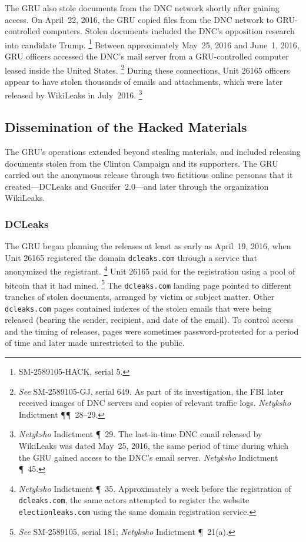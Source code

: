 The GRU also stole documents from the DNC network shortly after gaining access.
On April~22, 2016, the GRU copied files from the DNC network to GRU-controlled computers.
Stolen documents included the DNC's opposition research into candidate Trump.%
\footnote{ SM-2589105-HACK, serial 5.
}
Between approximately May~25, 2016 and June~1, 2016, GRU officers accessed the DNC's mail server from a  GRU-controlled computer leased inside the United States.%
\footnote{
\textit{See} SM-2589105-GJ, serial 649. As part of its investigation, the FBI later received images of DNC servers and copies of relevant traffic logs.
\textit{Netyksho} Indictment \P\P~28--29.}
During these connections, Unit 26165 officers appear to have stolen thousands of emails and attachments, which were later released by WikiLeaks in July~2016.%
\footnote{\textit{Netyksho} Indictment \P~29.
The last-in-time DNC email released by WikiLeaks was dated May~25, 2016, the same period of time during which the GRU gained access to the DNC's email server.
\textit{Netyksho} Indictment \P~45.}

\subsection{Dissemination of the Hacked Materials}

The GRU's operations extended beyond stealing materials, and included releasing documents stolen from the Clinton Campaign and its supporters.
The GRU carried out the anonymous release through two fictitious online personas that it created---DCLeaks and Guccifer~2.0---and later through the organization WikiLeaks.

\subsubsection{DCLeaks}

The GRU began planning the releases at least as early as April~19, 2016, when Unit 26165 registered the domain \verb+dcleaks.com+ through a service that anonymized the registrant.%
\footnote{\textit{Netyksho} Indictment \P~35.
Approximately a week before the registration of \verb+dcleaks.com+, the same actors attempted to register the website \verb+electionleaks.com+ using the same domain registration service.
}
Unit 26165 paid for the registration using a pool of bitcoin that it had mined.%
\footnote{\textit{See} SM-2589105, serial 181;
\textit{Netyksho} Indictment \P~21(a).}
The \verb+dcleaks.com+ landing page pointed to different tranches of stolen documents, arranged by victim or subject matter.
Other \verb+dcleaks.com+ pages contained indexes of the stolen emails that were being released (bearing the sender, recipient, and date of the email).
To control access and the timing of releases, pages were sometimes password-protected for a period of time and later made unrestricted to the public.

